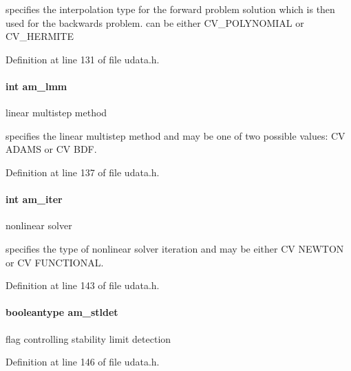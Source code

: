 specifies the interpolation type for the forward problem solution which is then used for the backwards problem. can be either C\+V\+\_\+\+P\+O\+L\+Y\+N\+O\+M\+I\+A\+L or C\+V\+\_\+\+H\+E\+R\+M\+I\+T\+E 

Definition at line 131 of file udata.\+h.

\hypertarget{struct_user_data_a18b6fbc6159783acab9b5f4b106077cd}{}
\paragraph[{am\+\_\+lmm}]{\setlength{\rightskip}{0pt plus 5cm}int am\+\_\+lmm}\label{struct_user_data_a18b6fbc6159783acab9b5f4b106077cd}
linear multistep method

specifies the linear multistep method and may be one of two possible values\+: C\+V A\+D\+A\+M\+S or C\+V B\+D\+F. 

Definition at line 137 of file udata.\+h.

\hypertarget{struct_user_data_a2e0183eade68209e6835d3199054f0cc}{}
\paragraph[{am\+\_\+iter}]{\setlength{\rightskip}{0pt plus 5cm}int am\+\_\+iter}\label{struct_user_data_a2e0183eade68209e6835d3199054f0cc}
nonlinear solver

specifies the type of nonlinear solver iteration and may be either C\+V N\+E\+W\+T\+O\+N or C\+V F\+U\+N\+C\+T\+I\+O\+N\+A\+L. 

Definition at line 143 of file udata.\+h.

\hypertarget{struct_user_data_a7d39c238c319f0164a15744950bfd021}{}
\paragraph[{am\+\_\+stldet}]{\setlength{\rightskip}{0pt plus 5cm}booleantype am\+\_\+stldet}\label{struct_user_data_a7d39c238c319f0164a15744950bfd021}
flag controlling stability limit detection 

Definition at line 146 of file udata.\+h.

\hypertarget{struct_user_data_a7283826ef630f92bb04052eb79a377e5}{}
